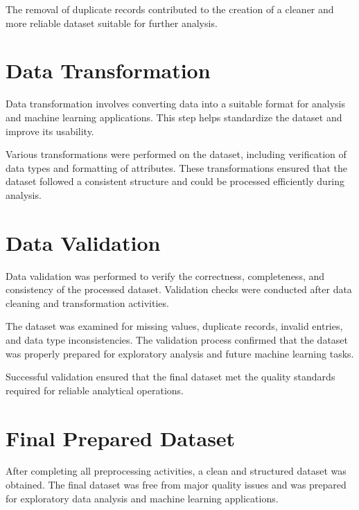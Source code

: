 \documentclass[12pt,a4paper]{report}
\begin{document}
The removal of duplicate records contributed to the creation of a cleaner and more reliable dataset suitable for further analysis.


\section{Data Transformation}

Data transformation involves converting data into a suitable format for analysis and machine learning applications. This step helps standardize the dataset and improve its usability.

Various transformations were performed on the dataset, including verification of data types and formatting of attributes. These transformations ensured that the dataset followed a consistent structure and could be processed efficiently during analysis.



\section{Data Validation}

Data validation was performed to verify the correctness, completeness, and consistency of the processed dataset. Validation checks were conducted after data cleaning and transformation activities.

The dataset was examined for missing values, duplicate records, invalid entries, and data type inconsistencies. The validation process confirmed that the dataset was properly prepared for exploratory analysis and future machine learning tasks.

Successful validation ensured that the final dataset met the quality standards required for reliable analytical operations.


\section{Final Prepared Dataset}

After completing all preprocessing activities, a clean and structured dataset was obtained. The final dataset was free from major quality issues and was prepared for exploratory data analysis and machine learning applications.
\end{document}

